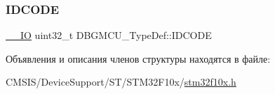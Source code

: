 \subsubsection{\texorpdfstring{IDCODE}{IDCODE}}
{\footnotesize\ttfamily \mbox{\hyperlink{group___c_m_s_i_s___c_m3__core__definitions_gaec43007d9998a0a0e01faede4133d6be}{\+\_\+\+\_\+\+IO}} uint32\+\_\+t D\+B\+G\+M\+C\+U\+\_\+\+Type\+Def\+::\+I\+D\+C\+O\+DE}



Объявления и описания членов структуры находятся в файле\+:\begin{DoxyCompactItemize}
\item 
C\+M\+S\+I\+S/\+Device\+Support/\+S\+T/\+S\+T\+M32\+F10x/\mbox{\hyperlink{stm32f10x_8h}{stm32f10x.\+h}}\end{DoxyCompactItemize}
